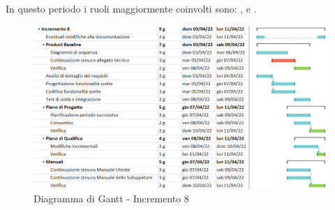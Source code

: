 In questo periodo i ruoli maggiormente coinvolti sono: \roleDesignerLow{}, \roleProgrammerLow{} e \roleVerifierLow{}.
\begin{figure}[H]
  \centering
  \includegraphics[scale=0.52]{immagini/incremento_8.png}
  \caption{Diagramma di Gantt - Incremento 8}
\end{figure}


